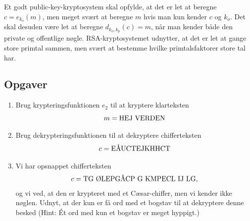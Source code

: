 \documentclass[12pt]{article}
\begin{document}
Et godt public-key-kryptosystem skal opfylde, at det er let at beregne $c=e_{k_o}(m)$, men meget svært at beregne $m$ hvis man kun kender $c$ og $k_o$. Det skal desuden være let at beregne $d_{k_o,k_p}(c) = m$, når man kender både den private og offentlige nøgle. RSA-kryptosystemet udnytter, at det er let at gange store primtal sammen, men svært at bestemme hvilke primtalsfaktorer store tal har. 
\subsection*{Opgaver}
\begin{enumerate}[label=\roman*)]
\item Brug krypteringsfunktionen $e_2$ til at kryptere klarteksten 
\[m = \textnormal{HEJ VERDEN}\]
\item Brug dekrypteringsfunktionen til at dekryptere chifferteksten
\[
c = \textnormal{EÅUCTEJKHHCT}
\]
\item Vi har opsnappet chifferteksten 
\[
c = \textnormal{TG ØLEPGÅCP G KMPECL IJ LG},
\]
og vi ved, at den er krypteret med et Cæsar-chiffer, men vi kender ikke nøglen. Udnyt, at der kun er få ord med et bogstav til at dekryptere denne besked (Hint: Ét ord med kun et bogstav er meget hyppigt.)
\end{enumerate}


\newpage
\end{document}
